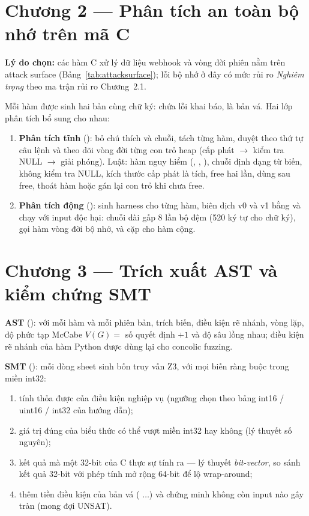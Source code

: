 \section{Chương 2 — Phân tích an toàn bộ nhớ trên mã C}
\textbf{Lý do chọn:} các hàm C xử lý dữ liệu webhook và vòng đời phiên nằm trên attack surface
(Bảng~\ref{tab:attacksurface}); lỗi bộ nhớ ở đây có mức rủi ro \emph{Nghiêm trọng} theo ma
trận rủi ro Chương~2.1.

Mỗi hàm được sinh hai bản cùng chữ ký:  chứa lỗi khai báo,  là
bản vá. Hai lớp phân tích bổ sung cho nhau:
\begin{enumerate}
  \item \textbf{Phân tích tĩnh} (): bỏ chú thích và chuỗi, tách từng
        hàm, duyệt theo thứ tự câu lệnh và theo dõi vòng đời từng con trỏ heap (cấp phát
        $\rightarrow$ kiểm tra NULL $\rightarrow$ giải phóng). Luật: hàm nguy hiểm
        (, , ), chuỗi định dạng từ biến, 
        không kiểm tra NULL, kích thước cấp phát là tích, free hai lần, dùng sau free, thoát
        hàm hoặc gán lại con trỏ khi chưa free.
  \item \textbf{Phân tích động} (): sinh harness  cho từng
        hàm, biên dịch v0 và v1 bằng  và chạy
        với input độc hại: chuỗi dài gấp 8 lần bộ đệm (520 ký tự cho chữ ký), gọi hàm vòng đời
        bộ nhớ, và cặp  cho hàm cộng.
\end{enumerate}

\section{Chương 3 — Trích xuất AST và kiểm chứng SMT}
\textbf{AST} (): với mỗi hàm và mỗi phiên bản, trích biến, điều kiện
rẽ nhánh, vòng lặp, độ phức tạp McCabe $V(G) = $ số quyết định $+ 1$ và độ sâu lồng nhau;
điều kiện rẽ nhánh của hàm Python được dùng lại cho concolic fuzzing.

\textbf{SMT} (): mỗi dòng sheet  sinh bốn truy
vấn Z3, với mọi biến ràng buộc trong miền int32:
\begin{enumerate}
  \item tính thỏa được của điều kiện nghiệp vụ (ngưỡng chọn theo bảng int16 / uint16 / int32 của
        hướng dẫn);
  \item giá trị đúng của biểu thức có thể vượt miền int32 hay không (lý thuyết số nguyên);
  \item kết quả mà một  32-bit của C thực sự tính ra — lý thuyết \emph{bit-vector}, so
        sánh kết quả 32-bit với phép tính mở rộng 64-bit để lộ wrap-around;
  \item thêm tiền điều kiện của bản vá ( $\ldots$) và chứng
        minh không còn input nào gây tràn (mong đợi UNSAT).
\end{enumerate}

